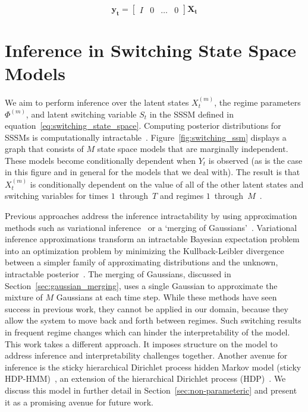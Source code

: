 \begin{equation}\label{eq:ssm_rep_of_var_output}
  \mathbf{y_t} = \begin{bmatrix} I & 0 & \hdots & 0 \end{bmatrix} \mathbf{X_t}
\end{equation}


\section{Inference in Switching State Space Models}\label{sec:inference_for_sssm}
We aim to perform inference over the latent states $X_t^{(m)}$, the regime parameters $\Phi^{(m)}$, and latent switching variable $S_t$ in the SSSM defined in equation~\ref{eq:switching_state_space}. Computing posterior distributions for SSSMs is computationally intractable~\citep{murphy2002dynamic, kim1994dynamic}. Figure~\ref{fig:switching_ssm} displays a graph that consists of $M$ state space models that are marginally independent. These models become conditionally dependent when $Y_t$ is observed (as is the case in this figure and in general for the models that we deal with). The result is that $X_t^{(m)}$ is conditionally dependent on the value of all of the other latent states and switching variables for times $1$~through~$T$ and regimes $1$~through~$M$~\citep{murphy2002dynamic,ghahramani2000variational}.

Previous approaches address the inference intractability by using approximation methods such as variational inference~\citep{ghahramani2000variational} or a `merging of Gaussians'~\citep{kim1999state,murphy2002dynamic}. Variational inference approximations transform an intractable Bayesian expectation problem into an optimization problem by minimizing the Kullback-Leibler divergence between a simpler family of approximating distributions and the unknown, intractable posterior~\citep{attias2000variational,saul1996exploiting,saul1996mean,blei2003latent}. The merging of Gaussians, discussed in Section~\ref{sec:gaussian_merging}, uses a single Gaussian to approximate the mixture of $M$ Gaussians at each time step. While these methods have seen success in previous work, they cannot be applied in our domain, because they allow the system to move back and forth between regimes. Such switching results in frequent regime changes which can hinder the interpretability of the model. This work takes a different approach. It imposes structure on the model to address inference and interpretability challenges together. Another avenue for inference is the sticky hierarchical Dirichlet process hidden Markov model (sticky HDP-HMM)~\citep{fox2009nonparametric,fox2007hierarchical}, an extension of the hierarchical Dirichlet process (HDP)~\citep{teh2005sharing}. We discuss this model in further detail in Section~\ref{sec:non-parameteric} and present it as a promising avenue for future work.



